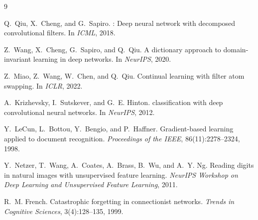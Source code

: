 \documentclass[11pt,letterpaper]{article}
\begin{document}

\begin{thebibliography}{9}

Q.~Qiu, X.~Cheng, and G.~Sapiro.
: Deep neural network with decomposed convolutional filters.
\newblock In \emph{ICML}, 2018.

Z.~Wang, X.~Cheng, G.~Sapiro, and Q.~Qiu.
\newblock A dictionary approach to domain-invariant learning in deep networks.
\newblock In \emph{NeurIPS}, 2020.

Z.~Miao, Z.~Wang, W.~Chen, and Q.~Qiu.
\newblock Continual learning with filter atom swapping.
\newblock In \emph{ICLR}, 2022.

A.~Krizhevsky, I.~Sutskever, and G.~E. Hinton.
 classification with deep convolutional neural networks.
\newblock In \emph{NeurIPS}, 2012.

Y.~LeCun, L.~Bottou, Y.~Bengio, and P.~Haffner.
\newblock Gradient-based learning applied to document recognition.
\newblock \emph{Proceedings of the IEEE}, 86(11):2278--2324, 1998.

Y.~Netzer, T.~Wang, A.~Coates, A.~Brass, B.~Wu, and A.~Y. Ng.
\newblock Reading digits in natural images with unsupervised feature learning.
\newblock \emph{NeurIPS Workshop on Deep Learning and Unsupervised Feature
  Learning}, 2011.

R.~M. French.
\newblock Catastrophic forgetting in connectionist networks.
\newblock \emph{Trends in Cognitive Sciences}, 3(4):128--135, 1999.

\end{thebibliography}
\end{document}
